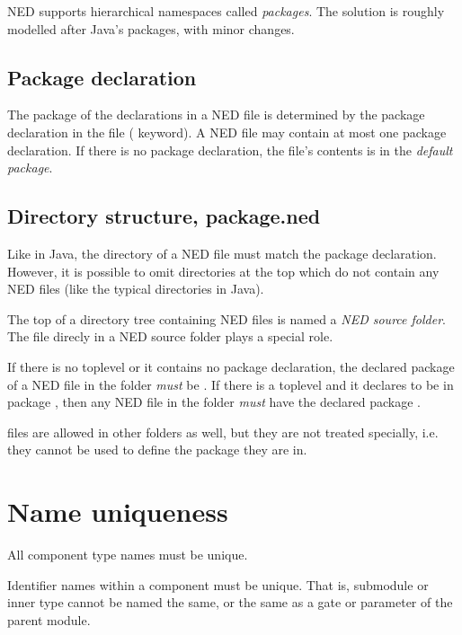 NED supports hierarchical namespaces called \textit{packages}. The solution
is roughly modelled after Java's packages, with minor changes.
\subsection{Package declaration}

The package of the declarations in a NED file is determined by the package
declaration in the file ( keyword). A NED file may contain at
most one package declaration. If there is no package declaration, the file's
contents is in the \textit{default package}.

\subsection{Directory structure, package.ned}

Like in Java, the directory of a NED file must match the package
declaration. However, it is possible to omit directories at the top which do
not contain any NED files (like the typical 
directories in Java).

The top of a directory tree containing NED files is named a \textit{NED source
folder}. The  file direcly in a NED source folder plays a
special role.

If there is no toplevel  or it contains no package declaration,
the declared package of a NED file in the folder 
\textit{must} be .
If there is a toplevel  and it declares to be in package
, then any NED file in the folder 
\textit{must} have the declared package .

\begin{note}
     files are allowed in other folders as well, but they
    are not treated specially, i.e. they cannot be used to define the package
    they are in.
\end{note}

\section{Name uniqueness}

All component type names must be unique.

Identifier names within a component must be unique. That is, submodule
or inner type cannot be named the same, or the same as a gate or
parameter of the parent module.



